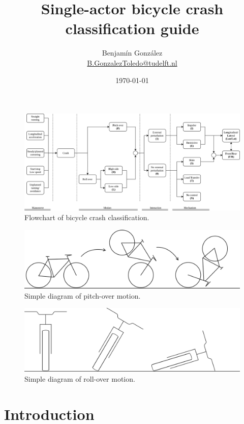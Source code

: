 \documentclass{article}
\title{Single-actor bicycle crash classification guide}
\author{
  Benjam\'in Gonz\'alez\\
  \small{\href{mailto:b.gonzaleztoledo@tudelft.nl}{B.GonzalezToledo@tudelft.nl}}
  }
\date{\today}
\begin{document}
\maketitle

\begin{figure}[h]
    \centering
    \includegraphics[width=\linewidth]{class-mindmap.png}
    \caption{Flowchart of bicycle crash classification.}
    \label{fig: flowchart}
\end{figure}

\begin{figure}[h]
    \centering
    \includegraphics[width=\linewidth]{pitch-over.png}
    \caption{Simple diagram of pitch-over motion.}
    \label{fig: pitchover}
\end{figure}

\begin{figure}[h]
    \centering
    \includegraphics[width=\linewidth]{roll-over.png}
    \caption{Simple diagram of roll-over motion.}
    \label{fig: rollover}
\end{figure}
\section{Introduction}
\end{document}
